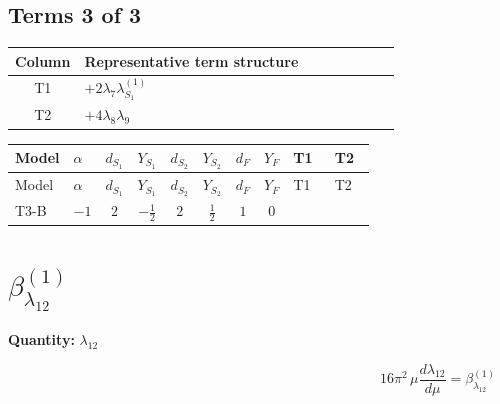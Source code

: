 \documentclass[8pt]{article}
\begin{document}
\begin{landscape}
\subsection*{Terms 3 of 3}
\begin{center}
\begin{tabular}{@{}c >{\raggedright\arraybackslash}p{0.82\linewidth}@{}}
\toprule
Column & Representative term structure \\
\midrule
T1 & \(\displaystyle +2 {\lambda_{7}} {\lambda_{S_1}^{(1)}}\) \\
\midrule
T2 & \(\displaystyle +4 {\lambda_{8}} {\lambda_{9}}\) \\
\midrule
\bottomrule
\end{tabular}
\end{center}
\smallskip
\tiny
\begin{longtable}{@{}llcccccc >{\raggedright\arraybackslash}p{0.21\linewidth} >{\raggedright\arraybackslash}p{0.21\linewidth}@{}}
\toprule
Model & $\alpha$ & $d_{S_1}$ & $Y_{S_1}$ & $d_{S_2}$ & $Y_{S_2}$ & $d_F$ & $Y_F$ & T1 & T2 \\
\midrule
\endfirsthead
\toprule
Model & $\alpha$ & $d_{S_1}$ & $Y_{S_1}$ & $d_{S_2}$ & $Y_{S_2}$ & $d_F$ & $Y_F$ & T1 & T2 \\
\midrule
\endhead
T3-B & $-1$ & $2$ & $-\frac{1}{2}$ & $2$ & $\frac{1}{2}$ & $1$ & $0$ & \scriptsize\adjustbox{max width=\linewidth}{$\begin{gathered} +2 {\lambda_{7}} {\lambda_{S_1}^{(1)}}\end{gathered}$} & \scriptsize\adjustbox{max width=\linewidth}{$\begin{gathered} +4 {\lambda_{8}} {\lambda_{9}}\end{gathered}$} \\
\midrule
\bottomrule
\end{longtable}
\clearpage
\section*{$\beta_{\lambda_{12}}^{(1)}$}
\noindent\textbf{Quantity: }$\lambda_{12}$\par\smallskip
\[16\pi^2\,\mu\frac{d \lambda_{12}}{d\mu}=\beta_{\lambda_{12}}^{(1)}\]

\end{landscape}
\end{document}
